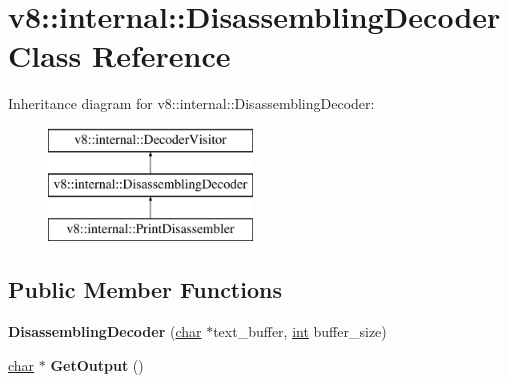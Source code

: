\hypertarget{classv8_1_1internal_1_1DisassemblingDecoder}{}\section{v8\+:\+:internal\+:\+:Disassembling\+Decoder Class Reference}
\label{classv8_1_1internal_1_1DisassemblingDecoder}
Inheritance diagram for v8\+:\+:internal\+:\+:Disassembling\+Decoder\+:\begin{figure}[H]
\begin{center}
\leavevmode
\includegraphics[height=3.000000cm]{classv8_1_1internal_1_1DisassemblingDecoder}
\end{center}
\end{figure}
\subsection*{Public Member Functions}
\begin{DoxyCompactItemize}
\item 
\mbox{\label{classv8_1_1internal_1_1DisassemblingDecoder_a0a46a9c311ed04da4116cf5d5871c779}} 
{\bfseries Disassembling\+Decoder} (\mbox{\hyperlink{classchar}{char}} $\ast$text\+\_\+buffer, \mbox{\hyperlink{classint}{int}} buffer\+\_\+size)
\item 
\mbox{\label{classv8_1_1internal_1_1DisassemblingDecoder_a7606b6388a7f320bff8edec101cb0e79}} 
\mbox{\hyperlink{classchar}{char}} $\ast$ {\bfseries Get\+Output} ()
\end{DoxyCompactItemize}
